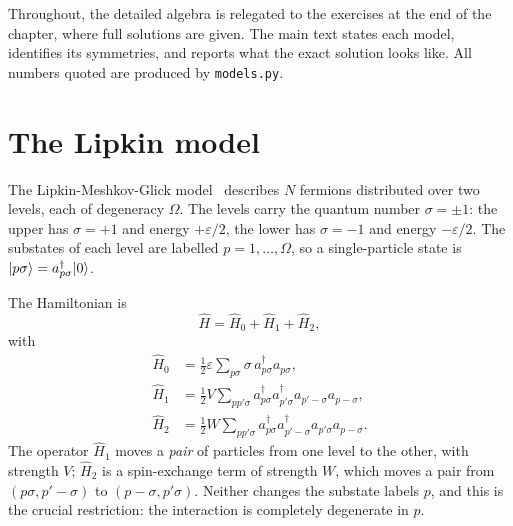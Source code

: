 Throughout, the detailed algebra is relegated to the exercises at the end of
the chapter, where full solutions are given.  The main text states each model,
identifies its symmetries, and reports what the exact solution looks like.
All numbers quoted are produced by \texttt{models.py}.

\section{The Lipkin model}
\label{sec:lipkin}

The Lipkin-Meshkov-Glick model~\cite{lipkin1965} describes $N$ fermions
distributed over two levels, each of degeneracy $\Omega$.  The levels carry
the quantum number $\sigma=\pm1$: the upper has $\sigma=+1$ and energy
$+\varepsilon/2$, the lower has $\sigma=-1$ and energy $-\varepsilon/2$.  The
substates of each level are labelled $p=1,\dots,\Omega$, so a single-particle
state is $\vert p\sigma \rangle=a_{p\sigma}^{\dagger}\vert 0 \rangle$.

The Hamiltonian is
\begin{equation}
  \hat{H} = \hat{H}_0 + \hat{H}_1 + \hat{H}_2,
  \label{eq:4-lipkinH}
\end{equation}
with
\begin{align}
  \hat{H}_0 &= \frac{1}{2}\varepsilon\sum_{p\sigma}\sigma\,
    a_{p\sigma}^{\dagger}a_{p\sigma},
  \label{eq:4-lipkinH0}\\
  \hat{H}_1 &= \frac{1}{2}V\sum_{p p'\sigma}
    a_{p\sigma}^{\dagger}a_{p'\sigma}^{\dagger}
    a_{p'-\sigma}a_{p-\sigma},
  \label{eq:4-lipkinH1}\\
  \hat{H}_2 &= \frac{1}{2}W\sum_{p p'\sigma}
    a_{p\sigma}^{\dagger}a_{p'-\sigma}^{\dagger}
    a_{p'\sigma}a_{p-\sigma}.
  \label{eq:4-lipkinH2}
\end{align}
The operator $\hat{H}_1$ moves a \emph{pair} of particles from one level to
the other, with strength $V$; $\hat{H}_2$ is a spin-exchange term of strength
$W$, which moves a pair from $(p\sigma,p'-\sigma)$ to $(p-\sigma,p'\sigma)$.
Neither changes the substate labels $p$, and this is the crucial restriction:
the interaction is completely degenerate in $p$.

